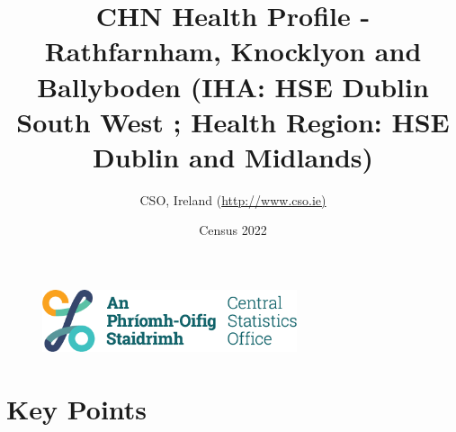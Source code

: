 \documentclass{article}
\title{CHN Health Profile - Rathfarnham, Knocklyon and Ballyboden (IHA: HSE Dublin South West ;  Health Region: HSE Dublin and Midlands) }
\date{Census 2022}
\author{CSO, Ireland  (\url{http://www.cso.ie)}}
\begin{document}


\begin{figure}
	\centering
\includegraphics[width =75mm]{../figures/CSO_Logo.png}
\end{figure}

				 
		   
						  
														  
																																													
												 
			 
\maketitle
					
													   
				 
						 
																																																																											   
				 
				  
  \pagebreak
    	    \tableofcontents

\pagebreak


\section{Key Points}
\end{document}
